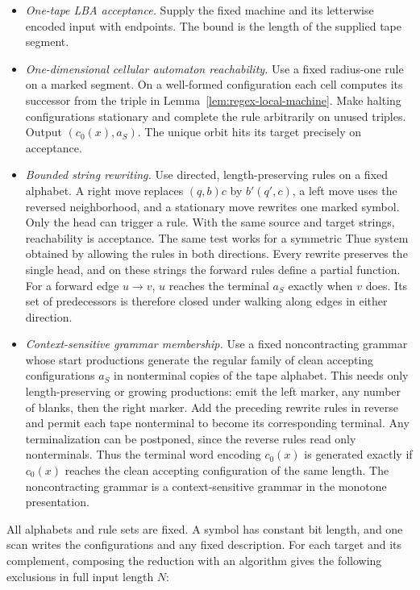 \documentclass[11pt]{article}
\theoremstyle{definition}
\theoremstyle{remark}
\begin{document}
\begin{itemize}
\item \emph{One-tape LBA acceptance.} Supply the fixed machine and
its letterwise encoded input with endpoints. The bound is the
length of the supplied tape segment.
\item \emph{One-dimensional cellular automaton reachability.}
Use a fixed radius-one rule on a marked segment. On a well-formed
configuration each cell computes its successor from the triple in
Lemma~\ref{lem:regex-local-machine}. Make halting configurations
stationary and complete the rule arbitrarily on unused triples.
Output $(c_0(x),a_S)$. The unique orbit hits its target precisely
on acceptance.
\item \emph{Bounded string rewriting.} Use directed, length-preserving
rules on a fixed alphabet. A right move replaces $(q,b)c$ by
$b'(q',c)$, a left move uses the reversed neighborhood, and a
stationary move rewrites one marked symbol. Only the head can
trigger a rule. With the same source and target strings, reachability
is acceptance. The same test works for a symmetric Thue system
obtained by allowing the rules in both directions. Every rewrite
preserves the single head, and on these strings the forward rules
define a partial function. For a forward edge $u\to v$, $u$ reaches
the terminal $a_S$ exactly when $v$ does. Its set of predecessors is
therefore closed under walking along edges in either direction.
\item \emph{Context-sensitive grammar membership.} Use a fixed
noncontracting grammar whose start productions generate the regular
family of clean accepting configurations $a_S$ in nonterminal copies
of the tape alphabet. This needs only length-preserving or growing
productions: emit the left marker, any number of blanks, then the
right marker. Add the preceding rewrite rules in reverse and permit
each tape nonterminal to become its corresponding terminal. Any
terminalization can be postponed, since the reverse rules read only
nonterminals. Thus the terminal word encoding $c_0(x)$ is generated
exactly if $c_0(x)$ reaches the clean accepting configuration of the
same length. The noncontracting grammar is a context-sensitive
grammar in the monotone presentation.
\end{itemize}
All alphabets and rule sets are fixed. A symbol has constant bit
length, and one scan writes the configurations and any fixed description.
For each target and its complement, composing the reduction with
an algorithm gives the following exclusions in full input length $N$:
\end{document}
